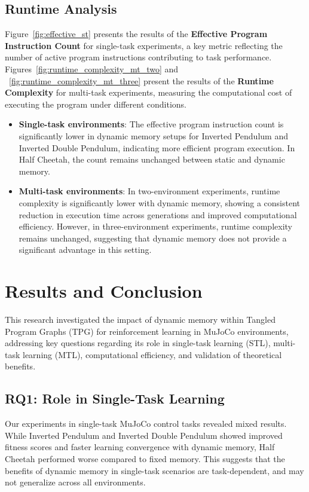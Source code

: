 \documentclass[sigconf]{acmart}
\begin{document}
\subsection{Runtime Analysis}
Figure~\ref{fig:effective_st} presents the results of the \textbf{Effective Program Instruction Count} for single-task experiments,
a key metric reflecting the number of active program instructions contributing to task performance.
Figures~\ref{fig:runtime_complexity_mt_two} and ~\ref{fig:runtime_complexity_mt_three} present the 
results of the \textbf{Runtime Complexity} for multi-task experiments, measuring the computational cost of executing the 
program under different conditions.

\begin{itemize}
  \item \textbf{Single-task environments}: The effective program instruction count is significantly lower in dynamic memory setups for Inverted Pendulum and Inverted Double Pendulum, indicating more efficient program execution. In Half Cheetah, the count remains unchanged between static and dynamic memory.
  \item \textbf{Multi-task environments}: In two-environment experiments, runtime complexity is significantly lower with dynamic memory, showing a consistent reduction in execution time across generations and improved computational efficiency. However, in three-environment experiments, runtime complexity remains unchanged, suggesting that dynamic memory does not provide a significant advantage in this setting.
\end{itemize}

\section{Results and Conclusion}
\label{sec:results}

This research investigated the impact of dynamic memory within Tangled Program Graphs (TPG) for reinforcement learning in MuJoCo environments, addressing key questions regarding its role in single-task learning (STL), multi-task learning (MTL), computational efficiency, and validation of theoretical benefits.

\subsection{RQ1: Role in Single-Task Learning}
Our experiments in single-task MuJoCo control tasks revealed mixed results. While Inverted Pendulum and Inverted Double Pendulum showed improved fitness scores and faster learning convergence with dynamic memory, Half Cheetah performed worse compared to fixed memory. This suggests that the benefits of dynamic memory in single-task scenarios are task-dependent, and may not generalize across all environments.
\end{document}
